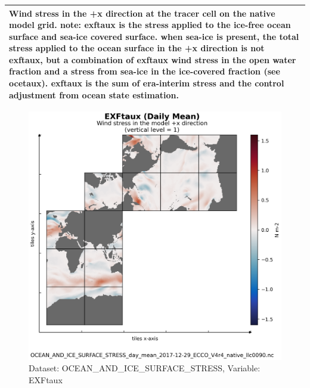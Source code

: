 \begin{longtable}{|m{}|m{}|m{}|m{}|}
\multicolumn{4}{|p{1\textwidth}|}{\footnotesize{{Wind stress in the +x direction at the tracer cell on the native model grid. note: exftaux is the stress applied to the ice-free ocean surface and sea-ice covered surface. when sea-ice is present, the total stress applied to the ocean surface in the +x direction is not exftaux, but a combination of exftaux wind stress in the open water fraction and a stress from sea-ice in the ice-covered fraction (see ocetaux). exftaux is the sum of era-interim stress and the control adjustment from ocean state estimation.}}} \\ \hline
\end{longtable}

\begin{figure}[H]
\centering
\includegraphics[scale=0.55]{../images/plots/v4r4/native_plots/Ocean_and_Sea-Ice_Surface_Stress/EXFtaux.png}
\caption{Dataset: OCEAN\_AND\_ICE\_SURFACE\_STRESS, Variable: EXFtaux}
\label{tab:table-OCEAN_AND_ICE_SURFACE_STRESS_EXFtaux-Plot}
\end{figure}
\newpage
\pagebreak
